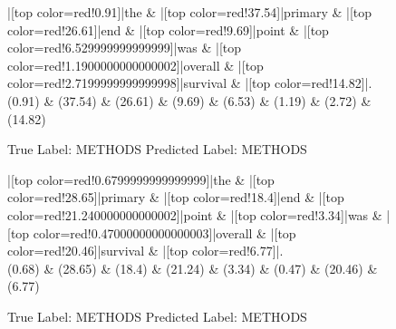 \documentclass[a4paper, landscape]{article}
\begin{document}
\begin{figure}
\begin{center}
\begin{dependency}
\begin{deptext}
|[top color=red!0.91]|the \& |[top color=red!37.54]|primary \& |[top color=red!26.61]|end \& |[top color=red!9.69]|point \& |[top color=red!6.529999999999999]|was \& |[top color=red!1.1900000000000002]|overall \& |[top color=red!2.7199999999999998]|survival \& |[top color=red!14.82]|.\\
(0.91) \& (37.54) \& (26.61) \& (9.69) \& (6.53) \& (1.19) \& (2.72) \& (14.82)\\
\end{deptext}
\end{dependency}
\end{center}
\caption{True Label: METHODS Predicted Label: METHODS}
\end{figure}
\clearpage
\begin{figure}
\begin{center}
\begin{dependency}
\begin{deptext}
|[top color=red!0.6799999999999999]|the \& |[top color=red!28.65]|primary \& |[top color=red!18.4]|end \& |[top color=red!21.240000000000002]|point \& |[top color=red!3.34]|was \& |[top color=red!0.47000000000000003]|overall \& |[top color=red!20.46]|survival \& |[top color=red!6.77]|.\\
(0.68) \& (28.65) \& (18.4) \& (21.24) \& (3.34) \& (0.47) \& (20.46) \& (6.77)\\
\end{deptext}
\end{dependency}
\end{center}
\caption{True Label: METHODS Predicted Label: METHODS}
\end{figure}
\clearpage
\end{document}
